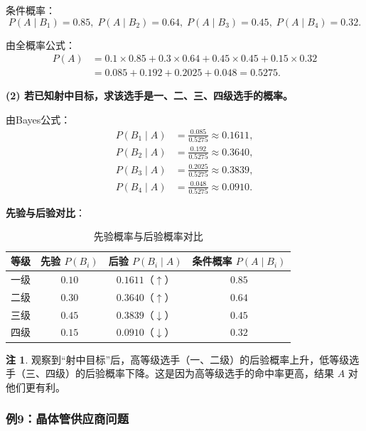 \documentclass[11pt,a4paper]{report}
\theoremstyle{definition}
\newtheorem{note}{注}[chapter]
\begin{document}
条件概率：
\[
P(A \mid B_1) = 0.85,\; P(A \mid B_2) = 0.64,\; P(A \mid B_3) = 0.45,\; P(A \mid B_4) = 0.32.
\]

由全概率公式：
\begin{align*}
P(A) &= 0.1 \times 0.85 + 0.3 \times 0.64 + 0.45 \times 0.45 + 0.15 \times 0.32 \\
&= 0.085 + 0.192 + 0.2025 + 0.048 = \boxed{0.5275}.
\end{align*}

\textbf{(2) 若已知射中目标，求该选手是一、二、三、四级选手的概率。}

由Bayes公式：
\[
\begin{aligned}
P(B_1 \mid A) &= \frac{0.085}{0.5275} \approx \boxed{0.1611}, \\
P(B_2 \mid A) &= \frac{0.192}{0.5275} \approx \boxed{0.3640}, \\
P(B_3 \mid A) &= \frac{0.2025}{0.5275} \approx \boxed{0.3839}, \\
P(B_4 \mid A) &= \frac{0.048}{0.5275} \approx \boxed{0.0910}.
\end{aligned}
\]

\textbf{先验与后验对比}：

\begin{table}[htbp]
\centering
\caption{先验概率与后验概率对比}
\begin{tabular}{@{}cccc@{}}
\toprule
\textbf{等级} & \textbf{先验} $P(B_i)$ & \textbf{后验} $P(B_i \mid A)$ & \textbf{条件概率} $P(A \mid B_i)$ \\
\midrule
一级 & $0.10$ & $0.1611$（$\uparrow$） & $0.85$ \\
二级 & $0.30$ & $0.3640$（$\uparrow$） & $0.64$ \\
三级 & $0.45$ & $0.3839$（$\downarrow$） & $0.45$ \\
四级 & $0.15$ & $0.0910$（$\downarrow$） & $0.32$ \\
\bottomrule
\end{tabular}
\end{table}

\begin{note}
观察到``射中目标''后，高等级选手（一、二级）的后验概率上升，低等级选手（三、四级）的后验概率下降。这是因为高等级选手的命中率更高，结果 $A$ 对他们更有利。
\end{note}

\subsubsection{例9：晶体管供应商问题}
\end{document}
